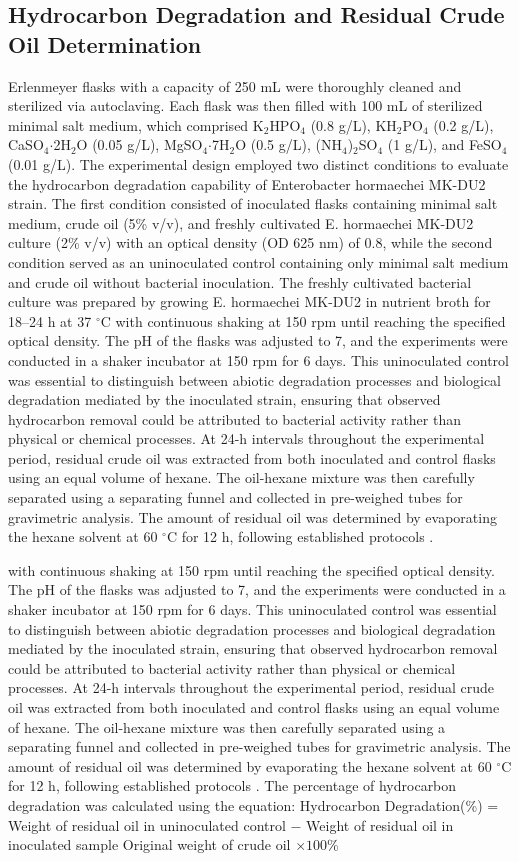 \documentclass{svjour3}
\begin{document}
\subsection{Hydrocarbon Degradation and Residual Crude Oil Determination}
Erlenmeyer flasks with a capacity of 250 mL were thoroughly cleaned and sterilized via autoclaving. Each flask was then filled with 100 mL of sterilized minimal salt medium, which comprised K$_2$HPO$_4$ (0.8 g/L), KH$_2$PO$_4$ (0.2 g/L), CaSO$_4$$\cdot$2H$_2$O (0.05 g/L), MgSO$_4$$\cdot$7H$_2$O (0.5 g/L), (NH$_4$)$_2$SO$_4$ (1 g/L), and FeSO$_4$ (0.01 g/L). The experimental design employed two distinct conditions to evaluate the hydrocarbon degradation capability of Enterobacter hormaechei MK-DU2 strain. The first condition consisted of inoculated flasks containing minimal salt medium, crude oil (5\% v/v), and freshly cultivated E. hormaechei MK-DU2 culture (2\% v/v) with an optical density (OD 625 nm) of 0.8, while the second condition served as an uninoculated control containing only minimal salt medium and crude oil without bacterial inoculation. The freshly cultivated bacterial culture was prepared by growing E. hormaechei MK-DU2 in nutrient broth for 18–24 h at 37 $^\circ$C with continuous shaking at 150 rpm until reaching the specified optical density. The pH of the flasks was adjusted to 7, and the experiments were conducted in a shaker incubator at 150 rpm for 6 days. This uninoculated control was essential to distinguish between abiotic degradation processes and biological degradation mediated by the inoculated strain, ensuring that observed hydrocarbon removal could be attributed to bacterial activity rather than physical or chemical processes. At 24-h intervals throughout the experimental period, residual crude oil was extracted from both inoculated and control flasks using an equal volume of hexane. The oil-hexane mixture was then carefully separated using a separating funnel and collected in pre-weighed tubes for gravimetric analysis. The amount of residual oil was determined by evaporating the hexane solvent at 60 $^\circ$C for 12 h, following established protocols \cite{31}.

with continuous shaking at 150 rpm until reaching the specified optical density. The pH of the flasks was adjusted to 7, and the experiments were conducted in a shaker incubator at 150 rpm for 6 days. This uninoculated control was essential to distinguish between abiotic degradation processes and biological degradation mediated by the inoculated strain, ensuring that observed hydrocarbon removal could be attributed to bacterial activity rather than physical or chemical processes. At 24-h intervals throughout the experimental period, residual crude oil was extracted from both inoculated and control flasks using an equal volume of hexane. The oil-hexane mixture was then carefully separated using a separating funnel and collected in pre-weighed tubes for gravimetric analysis. The amount of residual oil was determined by evaporating the hexane solvent at 60 $^\circ$C for 12 h, following established protocols \cite{31}.
The percentage of hydrocarbon degradation was calculated using the equation:
Hydrocarbon Degradation(\%) =
Weight of residual oil in uninoculated control $-$ Weight of residual oil in inoculated sample
Original weight of crude oil
$\times 100\%$
\end{document}

